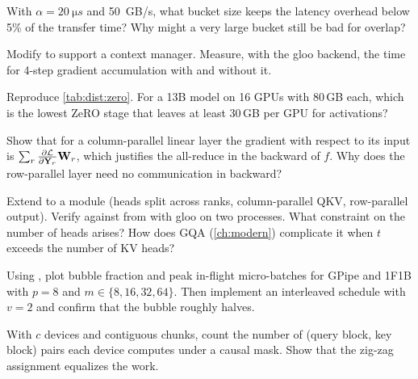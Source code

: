 \begin{exercise}
With $\alpha=\SI{20}{\micro s}$ and \SI{50}{GB/s}, what bucket size keeps the latency overhead
below 5\% of the transfer time? Why might a very large bucket still be bad for overlap?
\end{exercise}

\begin{exercise}
Modify  to support a  context manager. Measure, with the
gloo backend, the time for 4-step gradient accumulation with and without it.
\end{exercise}

\begin{exercise}
Reproduce \cref{tab:dist:zero}. For a 13B model on 16 GPUs with 80\,GB each, which is the lowest
ZeRO stage that leaves at least 30\,GB per GPU for activations?
\end{exercise}

\begin{exercise}[TP backward]
Show that for a column-parallel linear layer the gradient with respect to its input is
$\sum_r \frac{\partial\mathcal L}{\partial \mathbf{Y}_r}\mathbf{W}_r$, which justifies the all-reduce in the
backward of $f$. Why does the row-parallel layer need no communication in backward?
\end{exercise}

\begin{exercise}
Extend  to a  module (heads split across
ranks, column-parallel QKV, row-parallel output). Verify against  from
 with gloo on two processes. What constraint on the number of heads arises?
How does GQA (\cref{ch:modern}) complicate it when $t$ exceeds the number of KV heads?
\end{exercise}

\begin{exercise}[Bubbles]
Using , plot bubble fraction and peak in-flight micro-batches for
GPipe and 1F1B with $p=8$ and $m\in\{8,16,32,64\}$. Then implement an interleaved schedule with
$v=2$ and confirm that the bubble roughly halves.
\end{exercise}

\begin{exercise}
With $c$ devices and contiguous chunks, count the number of (query block, key block) pairs each
device computes under a causal mask. Show that the zig-zag assignment equalizes the work.
\end{exercise}

